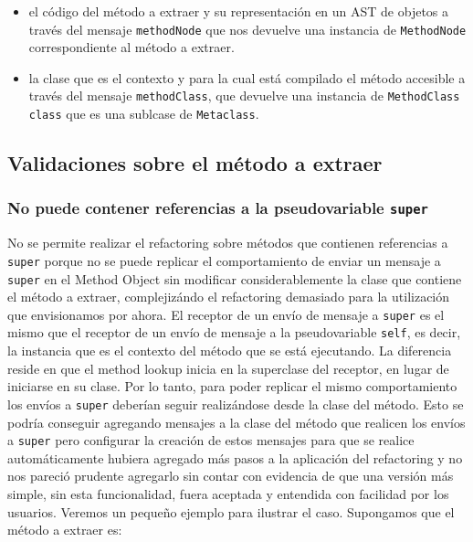 \begin{itemize}
    \item el código del método a extraer y su representación en un AST de
      objetos a través del mensaje \lstinline{methodNode} que nos devuelve una
      instancia de \lstinline{MethodNode} correspondiente al método a extraer.
    \item la clase que es el contexto y para la cual está compilado el método
      accesible a través del mensaje \lstinline{methodClass}, que devuelve una
      instancia de \lstinline{MethodClass class} que es una sublcase de
      \lstinline{Metaclass}.
\end{itemize}

\subsection*{Validaciones sobre el método a extraer}

\subsubsection*{No puede contener referencias a la pseudovariable \lstinline{super}}

No se permite realizar el refactoring sobre métodos que contienen referencias a
\lstinline{super} porque no se puede replicar el comportamiento de enviar un
mensaje a \lstinline{super} en el Method Object sin modificar considerablemente
la clase que contiene el método a extraer, complejizándo el refactoring
demasiado para la utilización que envisionamos por ahora. El receptor de un
envío de mensaje a \lstinline{super} es el mismo que el receptor de un envío de
mensaje a la pseudovariable \lstinline{self}, es decir, la instancia que es el
contexto del método que se está ejecutando. La diferencia reside en que el
method lookup inicia en la superclase del receptor, en lugar de iniciarse en su
clase. Por lo tanto, para poder replicar el mismo comportamiento los envíos a
\lstinline{super} deberían seguir realizándose desde la clase del método. Esto
se podría conseguir agregando mensajes a la clase del método que realicen los
envíos a \lstinline{super} pero configurar la creación de estos mensajes para
que se realice automáticamente hubiera agregado más pasos a la aplicación del
refactoring y no nos pareció prudente agregarlo sin contar con evidencia de que
una versión más simple, sin esta funcionalidad, fuera aceptada y entendida con
facilidad por los usuarios. Veremos un pequeño ejemplo para ilustrar el
caso. Supongamos que el método a extraer es:

